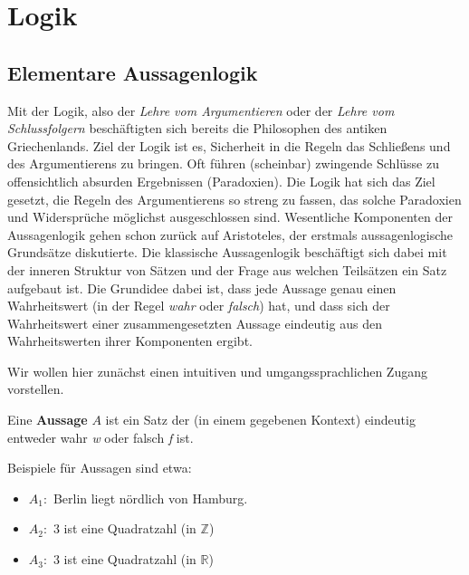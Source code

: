 \chapter{Logik}

\section{Elementare Aussagenlogik}

\setcounter{definition}{0}
\setcounter{beispiel}{0}
\setcounter{notiz}{0}

Mit der Logik, also der \textit{Lehre vom Argumentieren} oder der \textit{Lehre vom Schlussfolgern} beschäftigten sich 
bereits die Philosophen des antiken Griechenlands.
Ziel der Logik ist es, Sicherheit in die Regeln das Schließens und des Argumentierens zu bringen. 
Oft führen (scheinbar) zwingende Schlüsse zu offensichtlich absurden Ergebnissen (Paradoxien). Die Logik hat 
sich das Ziel gesetzt, die Regeln des Argumentierens so streng zu fassen, das solche Paradoxien und Widersprüche
möglichst ausgeschlossen sind. Wesentliche Komponenten der Aussagenlogik  gehen schon 
zurück auf Aristoteles, der 
erstmals aussagenlogische Grundsätze diskutierte. Die klassische Aussagenlogik beschäftigt sich dabei mit der 
inneren Struktur von Sätzen und der Frage aus welchen Teilsätzen ein Satz aufgebaut ist. Die Grundidee dabei 
ist, dass jede Aussage genau einen Wahrheitswert (in der Regel \textit{wahr} oder \textit{falsch}) hat, und dass 
sich der Wahrheitswert einer zusammengesetzten Aussage eindeutig aus den Wahrheitswerten ihrer Komponenten ergibt. 

Wir wollen hier zunächst einen intuitiven und umgangssprachlichen Zugang vorstellen.

\begin{definition}\label{defaussagen} Eine \textbf{Aussage} $A$ ist ein Satz der (in einem gegebenen Kontext) 
eindeutig entweder wahr \textit{w} oder falsch \textit{f} ist.
\end{definition}

\begin{beispiel}\label{bsp1aussagen} 
Beispiele für Aussagen sind etwa:
\begin{itemize}
\item $A_1:$ Berlin liegt nördlich von Hamburg.
\item $A_2:$ 3 ist eine Quadratzahl (in $\mathbb Z$)
\item $A_3:$ 3 ist eine Quadratzahl (in $\mathbb R$)
\end{itemize}
\end{beispiel}


